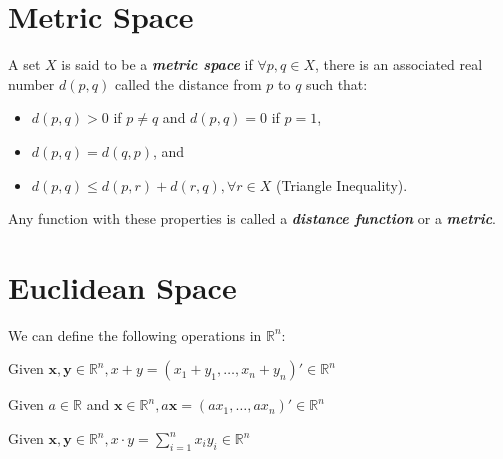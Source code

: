 
\section{Metric Space}

\begin{definition}
    A set $X$ is said to be a \textbf{\textit{metric space}} if $\forall p,q \in X$, there is an associated real number $d(p,q)$ called the distance from $p$ to $q$ such that:
    \begin{itemize}
        \item $d(p,q)>0$ if $p \neq q$ and $d(p,q) = 0$ if $p=1$,
        \item $d(p,q) = d(q,p)$, and
        \item $d(p,q) \leq d(p,r) + d(r,q), \forall r \in X$ (Triangle Inequality).
    \end{itemize}
\end{definition}

\begin{remark*}
    Any function with these properties is called a \textbf{\textit{distance function}} or a \textbf{\textit{metric}}.
\end{remark*}

\section{Euclidean Space}

We can define the following operations in $\mathbb{R}^{n}$:

\begin{definition}
    Given $\mathbf{x, y} \in \mathbb{R}^{n}, x+y = (x_{1}+y_{1}, \dots,x_{n}+y_{n})' \in \mathbb{R}^{n}$
\end{definition}

\begin{definition}
    Given $a \in \mathbb{R}$ and $\mathbf{x} \in \mathbb{R}^{n}, a \mathbf{x} = (ax_1,\dots,ax_n)' \in \mathbb{R}^{n}$
\end{definition}

\begin{definition}
    Given $\mathbf{x, y} \in \mathbb{R}^{n}, x\cdot y = \sum_{i=1}^{n} x_{i}y_{i} \in \mathbb{R}^{n}$
\end{definition}

